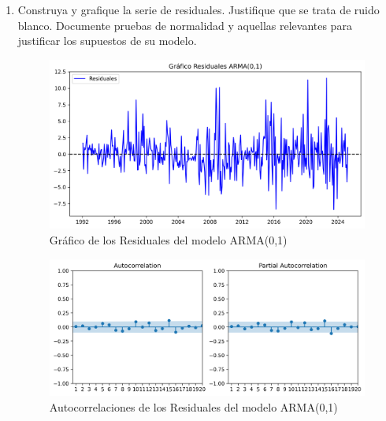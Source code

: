 \documentclass{article}
\theoremstyle{remark}
\theoremstyle{definition}
\begin{document}
\begin{enumerate}[label = \emph{\alph*})]
    \item {Construya y grafique la serie de residuales. Justifique que se trata de ruido blanco. Documente pruebas de normalidad y aquellas relevantes para justificar los supuestos de su modelo.}
        \begin{tcolorbox}[title=Soluci\'on 2.e]
            \begin{figure}[H]
                \centering
                \includegraphics[width=0.9\linewidth]{output/graf_resid.png}
                \caption{Gr\'afico de los Residuales del modelo ARMA(0,1)}
                \label{fig:residuales}
            \end{figure}
             \begin{figure}[H]
                \centering
                \includegraphics[width=0.9\linewidth]{output/acf_pacf_residuales.png}
                \caption{Autocorrelaciones de los Residuales del modelo ARMA(0,1)}
                \label{fig:corr_resid}
            \end{figure}

            
            

\end{tcolorbox}
\end{enumerate}
\end{document}
